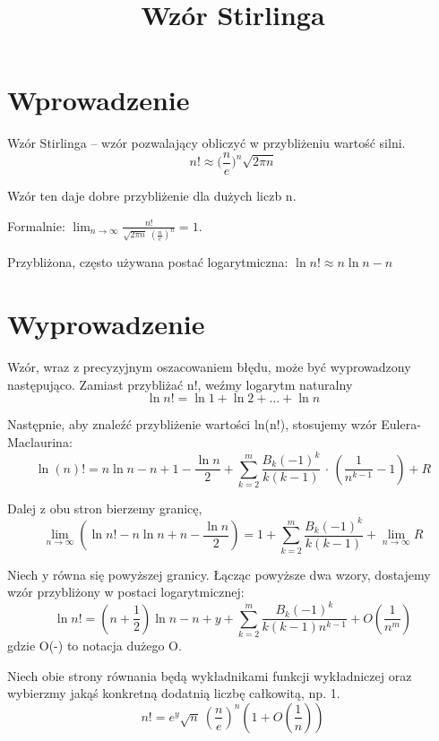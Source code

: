 \documentclass{article}
\begin{document}
\title{Wzór Stirlinga}
\maketitle

\section*{Wprowadzenie}

Wzór Stirlinga – wzór pozwalający obliczyć w przybliżeniu wartość silni. 
\[ n!\approx \bigg(\frac{n}{e}\bigg)^n\sqrt{2\pi n} \]

Wzór ten daje dobre przybliżenie dla dużych liczb n. 

Formalnie: \( \lim _{n\to \infty }{\frac {n!}{{\sqrt {2\pi n}}\;\left({\frac {n}{e}}\right)^{n}}}=1 \).

Przybliżona, często używana postać logarytmiczna: $ \ln n!\approx n\ln n-n $

\section*{Wyprowadzenie}

Wzór, wraz z precyzyjnym oszacowaniem błędu, może być wyprowadzony następująco. Zamiast przybliżać n!, weźmy logarytm naturalny 
$$ \ln n!=\ln 1+\ln 2+\ldots +\ln n $$

Następnie, aby znaleźć przybliżenie wartości ln(n!), stosujemy wzór Eulera-Maclaurina:
\begin{displaymath}
\ln(n)!=n\ln n-n+1-{\frac {\ln n}{2}}+\sum _{k=2}^{m}{\frac {B_{k}{(-1)}^{k}}{k(k-1)}}\,\cdot \,\left({\frac {1}{n^{k-1}}}-1\right)+R
\end{displaymath}

Dalej z obu stron bierzemy granicę,
\begin{equation*}
\lim _{n\to \infty }\left(\ln n!-n\ln n+n-{\frac {\ln n}{2}}\right)=1+\sum _{k=2}^{m}{\frac {B_{k}{(-1)}^{k}}{k(k-1)}}+\lim _{n\to \infty }R
\end{equation*}

Niech y  równa się powyższej granicy. Łącząc powyższe dwa wzory, dostajemy wzór przybliżony w postaci logarytmicznej: 
\[ \ln n!=\left(n+{\frac {1}{2}}\right)\ln n-n+y+\sum _{k=2}^{m}{\frac {B_{k}{(-1)}^{k}}{k(k-1)n^{k-1}}}+O\left({\frac {1}{n^{m}}}\right) \]
gdzie O(-) to notacja dużego O.

Niech obie strony równania będą wykładnikami funkcji wykładniczej oraz wybierzmy jakąś konkretną dodatnią liczbę całkowitą, np. 1.
\begin{displaymath}
n!=e^{y}{\sqrt {n}}\ \left({\frac {n}{e}}\right)^{n}\left(1+O\left({\frac {1}{n}}\right)\right)
\end{displaymath}
\end{document}
